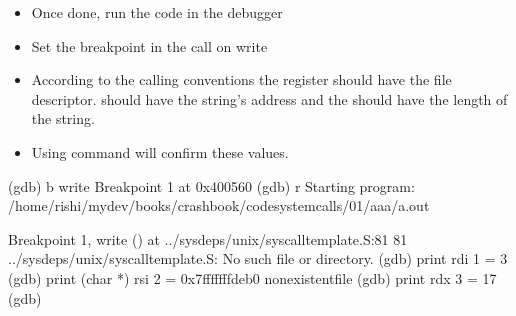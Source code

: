 \documentclass[letterpaper,10pt,english]{sphinxmanual}
\begin{document}
\begin{sphinxVerbatim}[commandchars=\\\{\},numbers=left,firstnumber=1,stepnumber=1]
 
 

  
     \PYG{p}{[}\PYG{p}{]}  
     
        

         
     
     
     
\end{sphinxVerbatim}
\begin{itemize}
\item {} 
Once done, run the code in the debugger 

\item {} 
Set the breakpoint in the call on write 

\item {} 
According to the calling conventions the register  should have the
file descriptor.  should have the string's address and the 
should have the length of the string.

\item {} 
Using  command will confirm these values.

\end{itemize}

\begin{sphinxVerbatim}[commandchars=\\\{\}]
(gdb) b write
Breakpoint 1 at 0x400560
(gdb) r
Starting program: /home/rishi/mydev/books/crash\PYGZus{}book/code\PYGZus{}system\PYGZus{}calls/01/aaa/a.out

Breakpoint 1, write () at ../sysdeps/unix/syscall\PYGZhy{}template.S:81
81  ../sysdeps/unix/syscall\PYGZhy{}template.S: No such file or directory.
(gdb) print \PYGZdl{}rdi
\PYGZdl{}1 = 3
(gdb) print (char *) \PYGZdl{}rsi
\PYGZdl{}2 = 0x7fffffffdeb0 \PYGZdq{}non\PYGZus{}existent\PYGZus{}file\PYGZdq{}
(gdb) print \PYGZdl{}rdx
\PYGZdl{}3 = 17
(gdb)
\end{sphinxVerbatim}
\end{document}
